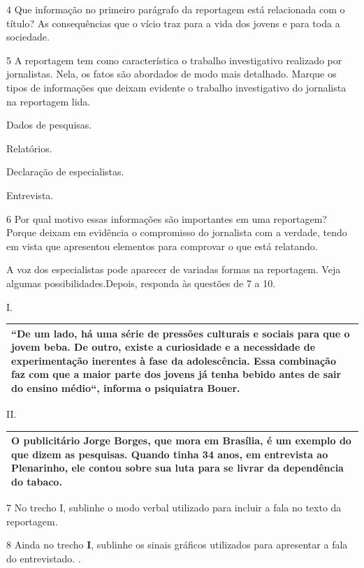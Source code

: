 \begin{itemize}
\begin{itemize}
\num{4} Que informação no primeiro parágrafo da reportagem está
relacionada com o título?  As consequências que o vício traz
para a vida dos jovens e para toda a sociedade.

\num{5} A reportagem tem como característica o trabalho investigativo
realizado por jornalistas. Nela, os fatos são abordados de modo mais
detalhado. Marque os tipos de informações que deixam evidente o trabalho
investigativo do jornalista na reportagem lida.

 Dados de pesquisas.

 Relatórios.

 Declaração de especialistas.

 Entrevista.

\num{6} Por qual motivo essas informações são importantes em uma
reportagem?  Porque deixam em evidência o compromisso do
jornalista com a verdade, tendo em vista que apresentou elementos para
comprovar o que está relatando.

A voz dos especialistas pode aparecer de variadas formas na reportagem.
Veja algumas possibilidades.Depois, responda às questões de 7 a 10.

I.

\begin{longtable}[]{@{}l@{}}
\toprule
{``}De um lado, há uma série de pressões culturais e sociais para que o
jovem beba. De outro, existe a curiosidade e a necessidade de
experimentação inerentes à fase da adolescência. Essa combinação faz com
que a maior parte dos jovens já tenha bebido antes de sair do ensino
médio{``}, {informa} o psiquiatra Bouer.\tabularnewline
\bottomrule
\end{longtable}

II.

\begin{longtable}[]{@{}l@{}}
\toprule
O publicitário Jorge Borges, que mora em Brasília, é um exemplo do que
dizem as pesquisas. Quando tinha 34 anos, em entrevista ao Plenarinho,
ele contou sobre sua luta para se livrar da dependência do
tabaco.\tabularnewline
\bottomrule
\end{longtable}

\num{7} No trecho I, sublinhe o modo verbal utilizado para incluir a
fala no texto da reportagem. 

\num{8} Ainda no trecho \textbf{I}, sublinhe os sinais gráficos
utilizados para apresentar a fala do entrevistado.
.


\end{itemize}
\end{itemize}
